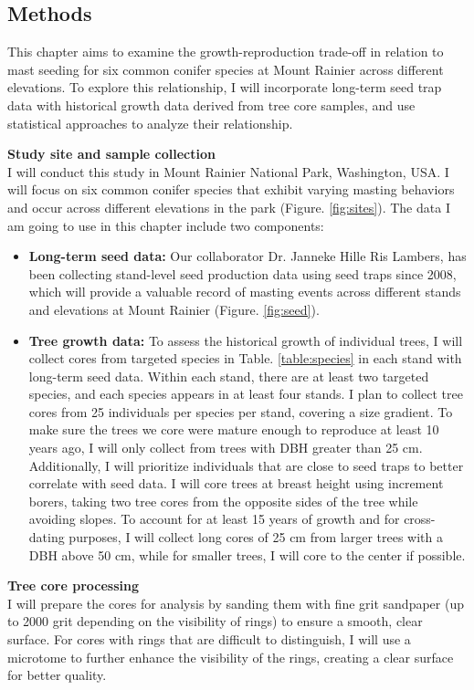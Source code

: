 \documentclass[11pt,letter]{article}
\begin{document}
\subsection{Methods}
This chapter aims to examine the growth-reproduction trade-off in relation to mast seeding for six common conifer species at Mount Rainier across different elevations. To explore this relationship, I will incorporate long-term seed trap data with historical growth data derived from tree core samples, and use statistical approaches to analyze their relationship.\par
\textbf{Study site and sample collection}\\
I will conduct this study in Mount Rainier National Park, Washington, USA. I will focus on six common conifer species that exhibit varying masting behaviors and occur across different elevations in the park (Figure. \ref{fig:sites}). The data I am going to use in this chapter include two components:	
\begin{itemize}
	\item \textbf{Long-term seed data:} Our collaborator Dr. Janneke Hille Ris Lambers, has been collecting stand-level seed production data using seed traps since 2008, which will provide a valuable record of masting events across different stands and elevations at Mount Rainier  (Figure. \ref{fig:seed}).
	\item \textbf{Tree growth data:}  To assess the historical growth of individual trees, I will collect cores from targeted species in Table. \ref{table:species} in each stand with long-term seed data. Within each stand, there are at least two targeted species, and each species appears in at least four stands. I plan to collect tree cores from 25 individuals per species per stand, covering a size gradient. To make sure the trees we core were mature enough to reproduce at least 10 years ago, I will only collect from trees with DBH greater than 25 cm. Additionally, I will prioritize individuals that are close to seed traps to better correlate with seed data. I will core trees at breast height using increment borers, taking two tree cores from the opposite sides of the tree while avoiding slopes. To account for at least 15 years of growth and for cross-dating purposes, I will collect long cores of 25 cm from larger trees with a DBH above 50 cm, while for smaller trees, I will core to the center if possible.
	\end{itemize}
\textbf{Tree core processing}\\
I will prepare the cores for analysis by sanding them with fine grit sandpaper (up to 2000 grit depending on the visibility of rings) to ensure a smooth, clear surface. For cores with rings that are difficult to distinguish, I will use a microtome to further enhance the visibility of the rings, creating a clear surface for better quality.\par
\end{document}
